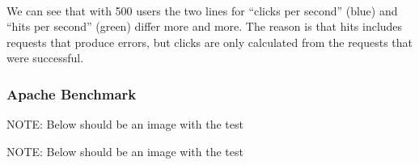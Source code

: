 \paragraph{}
We can see that with 500 users the two lines for “clicks per second” (blue) and “hits per second” (green) differ more and more. The reason is that hits includes requests that produce errors, but clicks are only calculated from the requests that were successful.




\subsubsection{Apache Benchmark}

NOTE: Below should be an image with the test 

NOTE: Below should be an image with the test 
